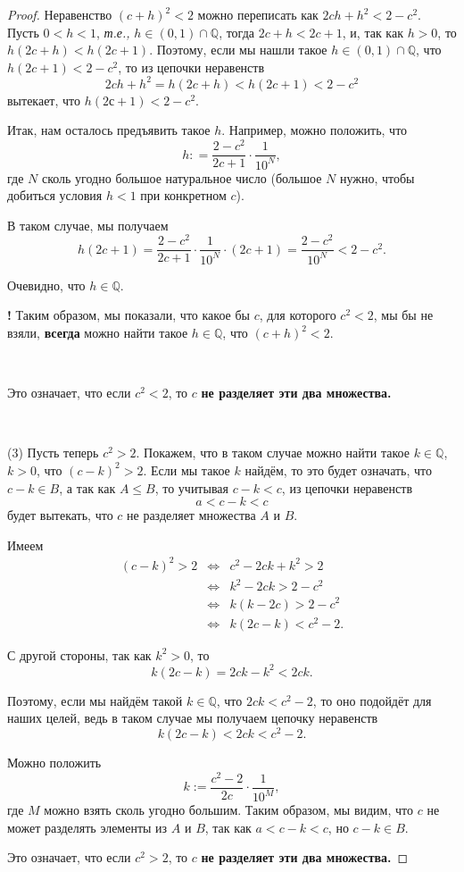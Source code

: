 \begin{proof}
Неравенство $(c+h)^2<2$ можно переписать как $2ch + h^2 < 2- c^2$. Пусть $0<h<1$, \textit{т.е.,} $h \in (0,1) \cap \mathbb{Q}$, тогда $2c+h < 2c+1$, и, так как $h >0$, то $h(2c+h)<h(2c+1)$. Поэтому, если мы нашли такое $h \in (0,1) \cap \mathbb{Q}$, что $h(2c+1) < 2-c^2$, то из цепочки неравенств
\[
 2ch +h^2 = h(2c+h) < h(2c+1) < 2-c^2
\]
вытекает, что $h(2с+1) < 2-c^2.$

Итак, нам осталось предъявить такое $h$. Например, можно положить, что
\[
 h : = \frac{2-c^2}{2c+1}\cdot \frac{1}{10^N},
\]
где $N$ сколь угодно большое натуральное число (большое $N$ нужно, чтобы добиться условия $h<1$ при конкретном $c$).

В таком случае, мы получаем
\[
 h(2c+1) = \frac{2-c^2}{2c+1}\cdot \frac{1}{10^N} \cdot (2c+1) = \frac{2-c^2}{10^N} < 2-c^2.
\]

Очевидно, что $h \in \mathbb{Q}.$

\begin{mydanger}{\bf !}
    Таким образом, мы показали, что какое бы $c$, для которого $c^2<2$, мы бы не взяли, \textbf{всегда} можно найти такое $h\in \mathbb{Q}$, что $(c+h)^2<2$. 
\end{mydanger}~

\centerline{
{\color{red}Это означает, что если $c^2<2$, то $c$ \textbf{не разделяет эти два множества.}}}~

(3) Пусть теперь $c^2>2$. Покажем, что в таком случае можно найти такое $k\in \mathbb{Q}$, $k>0$, что $(c-k)^2 >2$. Если мы такое $k$ найдём, то это будет означать, что $c-k \in B$, а так как $A\le B$, то учитывая $c-k < c$, из цепочки неравенств
\[
 a< c-k < c 
\]
будет вытекать, что $c$ не разделяет множества $A$ и $B.$

Имеем
\begin{eqnarray*}
    (c-k)^2 >2 &\Longleftrightarrow& c^2 - 2ck + k^2 >2 \\
     &\Longleftrightarrow& k^2 - 2ck >2-c^2 \\
     &\Longleftrightarrow& k(k-2c) > 2 -c^2 \\
     &\Longleftrightarrow& k(2c - k) < c^2 - 2.
\end{eqnarray*}

С другой стороны, так как $k^2 >0$, то
\[
 k(2c-k) = 2ck - k^2 < 2ck.
\]

Поэтому, если мы найдём такой $k\in \mathbb{Q}$, что $2ck < c^2 - 2$, то оно подойдёт для наших целей, ведь в таком случае мы получаем цепочку неравенств
\[
 k(2c-k)<2ck < c^2-2. 
\]

Можно положить
\[
 k := \frac{c^2-2}{2c}\cdot \frac{1}{10^M},
\]
где $M$ можно взять сколь угодно большим. Таким образом, мы видим, что $c$ не может разделять элементы из $A$ и $B$, так как $a<c-k<c$, но $c-k \in B$.\\ 

\centerline{
{\color{red}Это означает, что если $c^2>2$, то $c$ \textbf{не разделяет эти два множества.}}}
\end{proof}

